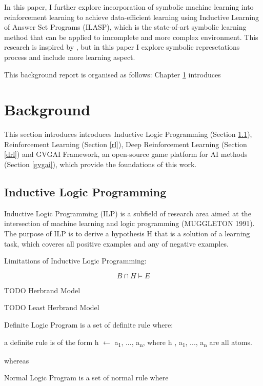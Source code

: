 \documentclass[12pt,twoside]{report}
\begin{document}
In this paper, I further explore incorporation of symbolic machine learning into reinforcement learning to achieve data-efficient learning using Inductive Learning of Answer Set Programs (ILASP), which is the state-of-art symbolic learning method that can be applied to imcomplete and more complex environment.
This research is inspired by \cite{Garnelo2016}, but in this paper I explore symbolic represetations process and include more learning aspect.

This background report is organised as follows: Chapter \ref{background} introduces

\chapter{Background}
\label{background}

This section introduces introduces Inductive Logic Programming (Section \ref{ilp}), Reinforcement Learning (Section \ref{rl}), Deep Reinforcement Learning (Section \ref{drl}) and GVGAI Framework, an open-source game platform for AI methods (Section \ref{gvgai}), which provide the foundations of this work.

\section{Inductive Logic Programming}
\label{ilp}
Inductive Logic Programming (ILP) is a subfield of research area aimed at the intersection of machine learning and logic programming (MUGGLETON 1991). The purpose of ILP is to derive a hypothesis H that is a solution of a learning task, which coveres all positive examples and any of negative examples.

Limitations of Inductive Logic Programming:

\begin{equation}
B \cap H \models E
\end{equation}

TODO Herbrand Model

TODO Least Herbrand Model

Definite Logic Program is a set of definite rule where: \newline

a definite rule is of the form h $\leftarrow$ a\textsubscript{1}, ..., a\textsubscript{n}, where h , a\textsubscript{1}, ..., a\textsubscript{n} are all atoms.

whereas

Normal Logic Program is a set of normal rule where
\end{document}

